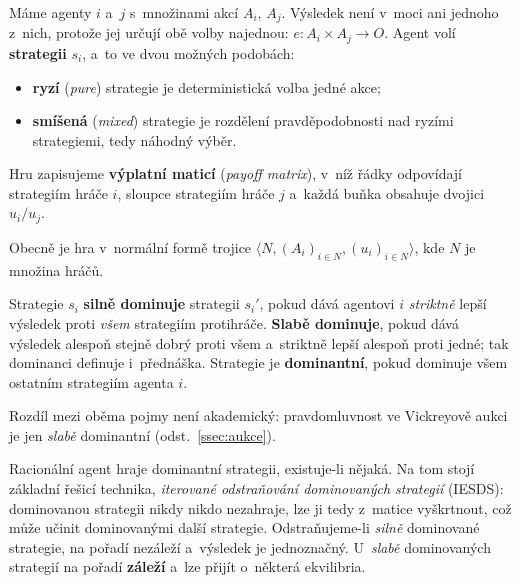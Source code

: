 \documentclass[11pt,a4paper]{article}
\theoremstyle{definition}
\begin{document}
\begin{defbox}
Máme agenty $i$ a~$j$ s~množinami akcí $A_i$, $A_j$. Výsledek není v~moci ani jednoho z~nich,
protože jej určují obě volby najednou: $e : A_i \times A_j \to O$. Agent volí \textbf{strategii}
$s_i$, a~to ve dvou možných podobách:
\begin{itemize}
\item \textbf{ryzí} (\emph{pure}) strategie je deterministická volba jedné akce;
\item \textbf{smíšená} (\emph{mixed}) strategie je rozdělení pravděpodobnosti nad ryzími
  strategiemi, tedy náhodný výběr.
\end{itemize}
Hru zapisujeme \textbf{výplatní maticí} (\emph{payoff matrix}), v~níž řádky odpovídají
strategiím hráče $i$, sloupce strategiím hráče $j$ a~každá buňka obsahuje dvojici $u_i / u_j$.

Obecně je hra v~normální formě trojice $\langle N, (A_i)_{i \in N}, (u_i)_{i \in N}\rangle$,
kde $N$ je množina hráčů.
\end{defbox}

\begin{defbox}[Dominance]
Strategie $s_i$ \textbf{silně dominuje} strategii $s_i'$, pokud dává agentovi $i$
\emph{striktně} lepší výsledek proti \emph{všem} strategiím protihráče. \textbf{Slabě dominuje},
pokud dává výsledek alespoň stejně dobrý proti všem a~striktně lepší alespoň proti jedné; tak
dominanci definuje i~přednáška. Strategie je \textbf{dominantní}, pokud dominuje všem ostatním
strategiím agenta $i$.

Rozdíl mezi oběma pojmy není akademický: pravdomluvnost ve Vickreyově aukci je jen \emph{slabě}
dominantní (odst.~\ref{ssec:aukce}).

Racionální agent hraje dominantní strategii, existuje-li nějaká. Na tom stojí základní řešicí
technika, \emph{iterované odstraňování dominovaných strategií} (IESDS): dominovanou strategii
nikdy nikdo nezahraje, lze ji tedy z~matice vyškrtnout, což může učinit dominovanými další
strategie. Odstraňujeme-li \emph{silně} dominované strategie, na pořadí nezáleží a~výsledek je
jednoznačný. U~\emph{slabě} dominovaných strategií na pořadí \textbf{záleží} a~lze přijít
o~některá ekvilibria.
\end{defbox}
\end{document}
